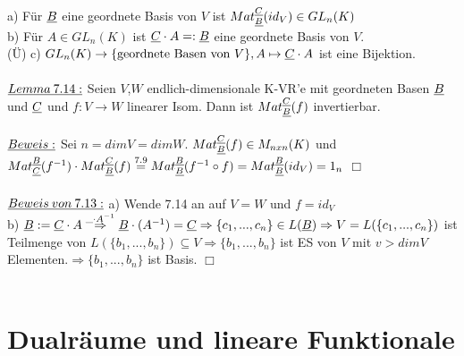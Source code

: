 \documentclass[fleqn, a4paper, 11pt]{article}
\begin{document}
a) F\"ur $\uline{B}$ eine geordnete Basis von $V$ ist $Mat_{\uline{B}}^{\uline{C}}(id_V)\in GL_n(K)$\\
b) F\"ur $A\in GL_n(K)$ ist $\uline{C}\cdot A=:\uline{B}$ eine geordnete Basis von $V$.\\
(\"U) c) $GL_n(K)\rightarrow\{\text{geordnete Basen von }V\},A\mapsto\uline{C}\cdot A$ ist eine Bijektion.\\
\\
$\uline{Lemma\:7.14:}$ Seien $V$,$W$ endlich-dimensionale K-VR'e mit geordneten Basen $\uline{B}$ und $\uline{C}$ und $f:V\rightarrow W$ linearer Isom. Dann ist $Mat_{\uline{B}}^{\uline{C}}(f)$ invertierbar.\\
\\
$\uline{Beweis:}$ Sei $n=dim V=dim W$. $Mat_{\uline{B}}^{\uline{C}}(f)\in M_{nxn}(K)$ und $Mat_{\uline{C}}^{\uline{B}}(f^{-1})\cdot Mat_{\uline{B}}^{\uline{C}}(f)\stackrel{7.9}{=} Mat_{\uline{B}}^{\uline{B}}(f^{-1}\circ f)=Mat_{\uline{B}}^{\uline{B}}(id_V)=1_n$ \hfill $\Box$\\
\\
$\uline{Beweis\:von\:7.13:}$ a) Wende 7.14 an auf $V=W$ und $f=id_V$\\
b) $\uline{B}:=\uline{C}\cdot A\stackrel{\_\cdot A^{-1}}{\Rightarrow} \uline{B}\cdot (A^{-1})=\uline{C}\Rightarrow\{c_1,...,c_n\}\in L(\uline{B})\Rightarrow V=L(\{c_1,...,c_n\})$ ist Teilmenge von $L(\{b_1,...,b_n\})\subseteq V\Rightarrow \{b_1,...,b_n\}$ ist ES von $V$ mit $v> dim V$ Elementen.$\Rightarrow\{b_1,...,b_n\}$ ist Basis. \hfill $\Box$\\
\\
\newpage
\section{Dualr\"aume und lineare Funktionale}
\end{document}

